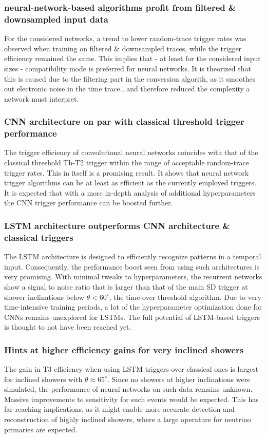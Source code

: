 \subsubsection{neural-network-based algorithms profit from filtered \& downsampled input data}

For the considered networks, a trend to lower random-trace trigger rates was observed when training on filtered \& downsampled traces, while the trigger efficiency
remained the same. This implies that - at least for the considered input sizes - compatibility mode is preferred for neural networks. It is theorized that this is
caused due to the filtering part in the conversion algorith, as it smoothes out electronic noise in the time trace., and therefore reduced the complexity a network 
must interpret. 

\subsubsection{CNN architecture on par with classical threshold trigger performance}

The trigger efficiency of convolutional neural networks coincides with that of the classical threshold Th-T2 trigger within the range of acceptable random-trace 
trigger rates. This in itself is a promising result. It shows that neural network trigger algorithms can be at least as efficient as the currently employed triggers.
It is expected that with a more in-depth analysis of additional hyperparameters the CNN trigger performance can be boosted further.

\subsubsection{LSTM architecture outperforms CNN architecture \& classical triggers}

The LSTM architecture is designed to efficiently recognize patterns in a temporal input. Consequently, the performance boost seen from using such architectures is
very promising. With minimal tweaks to hyperparameters, the recurrent networks show a signal to noise ratio that is larger than that of the main SD trigger at 
shower inclinations below $\theta < 60^\circ$, the time-over-threshold algorithm. Due to very time-intensive training periods, a lot of the hyperparameter 
optimization done for CNNs remains unexplored for LSTMs. The full potential of LSTM-based triggers is thought to not have been reached yet.

\subsubsection{Hints at higher efficiency gains for very inclined showers}

The gain in T3 efficiency when using LSTM triggers over classical ones is largest for inclined showers with $\theta\approx65^\circ$. Since no showers at higher 
inclinations were simulated, the performance of neural networks on such data remains unknown. Massive improvements to sensitivity for such events would be 
expected. This has far-reaching implications, as it might enable more accurate detection and reconstruction of highly inclined showers, where a large aperature for 
neutrino primaries are expected.